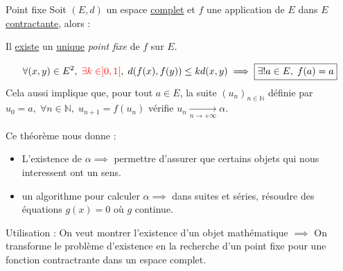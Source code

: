 \begin{Theorem}{\color{red} Point fixe}{}
  Soit $(E, d)$ un espace \underline{complet} et $f$ une application de $E$ dans $E$ \underline{contractante}, alors : 
  \begin{center}
Il \underline{existe} un \underline{unique} \textit{point fixe} de $f$ sur $E$.
  \end{center}
\[
  \forall (x, y) \in E ^{2}, \; {\color{red} \exists k \in ]0, 1[}, \; d(f(x),f(y)) \le k d(x, y) \implies \boxed{\exists ! a \in E,\; f(a) =a}
\]
Cela aussi implique que, pour tout $a \in E$, la suite $(u_n)_{n\in \mathbb{N}}$ définie par $u_0=a,\; \forall n \in \mathbb{N}, \; u _{n+1} = f(u_n)$ vérifie $u_n\underset{n \to + \infty}{\longrightarrow} \alpha$.
\end{Theorem}

\begin{note}{}{}



Ce théorème nous donne : 

\begin{itemize}
    \item L'existence de $\alpha \implies$ permettre d'assurer que certains objets qui nous interessent ont un sens.
    \item un algorithme pour calculer $\alpha \implies$ dans suites et séries, résoudre des équations $g(x)=0$ où $g$ continue.
\end{itemize}

Utilisation : On veut montrer l'existence d'un objet mathématique $\implies$ On transforme le problème d'existence en la recherche d'un point fixe pour une fonction contractrante dans un espace complet.

\end{note}


